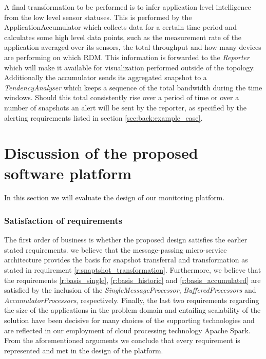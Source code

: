A final transformation to be performed is to infer application level intelligence from the low level sensor statuses. This is performed by the ApplicationAccumulator which collects data for a certain time period and calculates some high level data points, such as the measurement rate of the application averaged over its sensors, the total throughput and how many devices are performing on which RDM. This information is forwarded to the \emph{Reporter} which will make it available for visualization performed outside of the topology. Additionally the accumulator sends its aggregated snapshot to a \emph{TendencyAnalyser} which keeps a sequence of the total bandwidth during the time windows. Should this total consistently rise over a period of time or over a number of snapshots an alert will be sent by the reporter, as specified by the alerting requirements listed in section \ref{sec:back:example_case}.
	
\section{Discussion of the proposed software platform}
In this section we will evaluate the design of our monitoring platform. 

\subsubsection*{Satisfaction of requirements}
The first order of business is whether the proposed design satisfies the earlier stated requirements. we believe that the message-passing micro-service architecture provides the basis for snapshot transferral and transformation as stated in requirement \ref{r:snaptshot_transformation}. Furthermore, we believe that the requirements \ref{r:basis_single}, \ref{r:basis_historic} and \ref{r:basis_accumulated} are satisfied by the inclusion of the \emph{SingleMessageProcessor}, \emph{BufferedProcessors} and \emph{AccumulatorProcessors}, respectively. Finally, the last two requirements regarding the size of the applications in the problem domain and entailing scalability of the solution have been decisive for many choices of the supporting technologies and are reflected in our employment of cloud processing technology Apache Spark. From the aforementioned arguments we conclude that every requirement is represented and met in the design of the platform.

